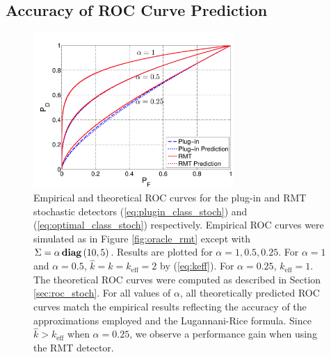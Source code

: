 \subsection{Accuracy of ROC Curve Prediction}

\begin{figure}
\centering
\includegraphics[width=3in]{figures/stoch_roc_pred.pdf}
\caption{Empirical and theoretical ROC curves for the plug-in and RMT stochastic detectors (\ref{eq:plugin_class_stoch}) and (\ref{eq:optimal_class_stoch}) respectively. Empirical ROC curves were simulated as in Figure \ref{fig:oracle_rmt} except with $\Sigma =\alpha\mathop{\bf diag}\left(10,5\right)$. Results are plotted for $\alpha=1,0.5,0.25$. For $\alpha=1$ and $\alpha=0.5$, $\widehat{k}=k=k_\text{eff}=2$ by (\ref{eq:keff}). For $\alpha=0.25$, $k_\text{eff}=1$. The theoretical ROC curves were computed as described in Section \ref{sec:roc_stoch}. For all values of $\alpha$, all theoretically predicted ROC curves match the empirical results reflecting the accuracy of the approximations employed and the Lugannani-Rice formula. Since $\widehat{k} > k_{\text{eff}}$ when $\alpha=0.25$, we observe a performance gain when using the RMT detector.}
\label{fig:stoch_roc_pred}
\end{figure}


